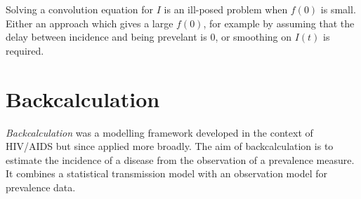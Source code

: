 \documentclass[thesis.tex]{subfiles}
\begin{document}



Solving a convolution equation for $I$ is an ill-posed problem when $f(0)$ is small.
Either an approach which gives a large $f(0)$, for example by assuming that the delay between incidence and being prevelant is 0, or smoothing on $I(t)$ is required.


\section{Backcalculation}


\emph{Backcalculation} was a modelling framework developed in the context of HIV/AIDS but since applied more broadly.
The aim of backcalculation is to estimate the incidence of a disease from the observation of a prevalence measure.
It combines a statistical transmission model with an observation model for prevalence data.
\end{document}

